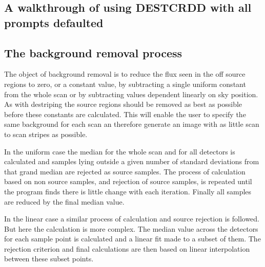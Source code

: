 \documentclass[twoside,11pt]{starlink}
\begin{document}
\subsection{A walkthrough of using DESTCRDD with all prompts defaulted}
\begin{small}
\end{small}
\subsection{The background removal process}
The object of background removal is to reduce the flux seen in the off source
regions to zero, or a constant value, by subtracting a single uniform constant
from the whole scan or by subtracting values dependent linearly on sky
position. As with destriping the source regions should be removed as best as
possible before these constants are calculated. This will enable the user to
specify the same background for each scan an therefore generate an image with
as little scan to scan stripes as possible.

In the uniform case the median for the whole scan and for all detectors is
calculated and samples lying outside a given number of standard deviations
from that grand median are rejected as source samples. The process of
calculation based on non source samples, and rejection of source samples,
is repeated until the program finds there is little change with each iteration.
Finally all samples are reduced by the final median value.

In the linear case a similar process of calculation and source rejection
is followed. But here the calculation is more complex. The median value across
the detectors for each sample  point is calculated and a linear fit made to
a subset of them. The rejection criterion and final calculations are then based
on linear interpolation between these subset points.
\end{document}
